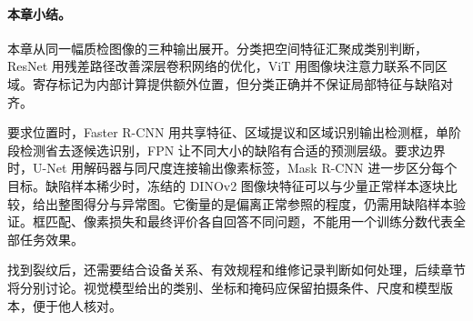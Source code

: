 \paragraph{本章小结。}
本章从同一幅质检图像的三种输出展开。分类把空间特征汇聚成类别判断，ResNet 用残差路径改善深层卷积网络的优化，ViT 用图像块注意力联系不同区域。寄存标记为内部计算提供额外位置，但分类正确并不保证局部特征与缺陷对齐。

要求位置时，Faster R-CNN 用共享特征、区域提议和区域识别输出检测框，单阶段检测省去逐候选识别，FPN 让不同大小的缺陷有合适的预测层级。要求边界时，U-Net 用解码器与同尺度连接输出像素标签，Mask R-CNN 进一步区分每个目标。缺陷样本稀少时，冻结的 DINOv2 图像块特征可以与少量正常样本逐块比较，给出整图得分与异常图。它衡量的是偏离正常参照的程度，仍需用缺陷样本验证。框匹配、像素损失和最终评价各自回答不同问题，不能用一个训练分数代表全部任务效果。

找到裂纹后，还需要结合设备关系、有效规程和维修记录判断如何处理，后续章节将分别讨论。视觉模型给出的类别、坐标和掩码应保留拍摄条件、尺度和模型版本，便于他人核对。
